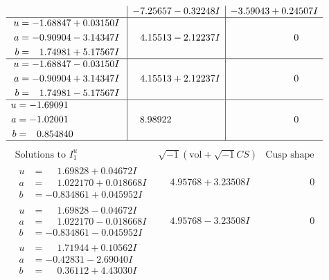 \documentclass[1p]{elsarticle_modified}
\theoremstyle{definition}
\newcommand{\I}{\sqrt{-1}}
\begin{document}
$$\begin{array}{c|c|c}
 & -7.25657 - 0.32248 I & -3.59043 + 0.24507 I \\ \hline\begin{aligned}
u &= -1.68847 + 0.03150 I \\
a &= -0.90904 - 3.14347 I \\
b &= \phantom{-}1.74981 + 5.17567 I\end{aligned}
 & \phantom{-}4.15513 - 2.12237 I & \phantom{-0.000000 } 0 \\ \hline\begin{aligned}
u &= -1.68847 - 0.03150 I \\
a &= -0.90904 + 3.14347 I \\
b &= \phantom{-}1.74981 - 5.17567 I\end{aligned}
 & \phantom{-}4.15513 + 2.12237 I & \phantom{-0.000000 } 0 \\ \hline\begin{aligned}
u &= -1.69091\phantom{ +0.000000I} \\
a &= -1.02001\phantom{ +0.000000I} \\
b &= \phantom{-}0.854840\phantom{ +0.000000I}\end{aligned}
 & \phantom{-}8.98922\phantom{ +0.000000I} & \phantom{-0.000000 } 0\\
 \hline 
 \end{array}$$\newpage$$\begin{array}{c|c|c}  
\text{Solutions to }I^u_{1}& \I (\text{vol} + \sqrt{-1}CS) & \text{Cusp shape}\\
 \hline 
\begin{aligned}
u &= \phantom{-}1.69828 + 0.04672 I \\
a &= \phantom{-}1.022170 + 0.018668 I \\
b &= -0.834861 + 0.045952 I\end{aligned}
 & \phantom{-}4.95768 + 3.23508 I & \phantom{-0.000000 } 0 \\ \hline\begin{aligned}
u &= \phantom{-}1.69828 - 0.04672 I \\
a &= \phantom{-}1.022170 - 0.018668 I \\
b &= -0.834861 - 0.045952 I\end{aligned}
 & \phantom{-}4.95768 - 3.23508 I & \phantom{-0.000000 } 0 \\ \hline\begin{aligned}
u &= \phantom{-}1.71944 + 0.10562 I \\
a &= -0.42831 - 2.69040 I \\
b &= \phantom{-}0.36112 + 4.43030 I\end{aligned}

\end{array}$$
\end{document}
